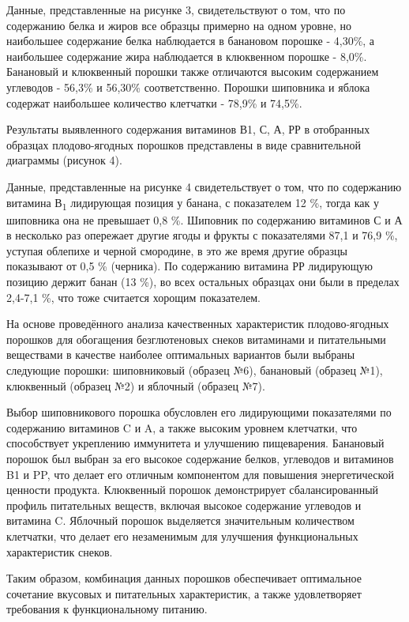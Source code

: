 \begin{multicols}{2}
Данные, представленные на рисунке 3, свидетельствуют о том, что по
содержанию белка и жиров все образцы примерно на одном уровне, но
наибольшее содержание белка наблюдается в банановом порошке - 4,30\%, а
наибольшее содержание жира наблюдается в клюквенном порошке - 8,0\%.
Банановый и клюквенный порошки также отличаются высоким содержанием
углеводов - 56,3\% и 56,30\% соответственно. Порошки шиповника и яблока
содержат наибольшее количество клетчатки - 78,9\% и 74,5\%.

Результаты выявленного содержания витаминов В1, С, А, РР в отобранных
образцах плодово-ягодных порошков представлены в виде сравнительной
диаграммы (рисунок 4).

Данные, представленные на рисунке 4 свидетельствует о том, что по
содержанию витамина В\textsubscript{1} лидирующая позиция у банана, с
показателем 12 \%, тогда как у шиповника она не превышает 0,8 \%.
Шиповник по содержанию витаминов С и А в несколько раз опережает другие
ягоды и фрукты с показателями 87,1 и 76,9 \%, уступая облепихе и черной
смородине, в это же время другие образцы показывают от 0,5 \% (черника).
По содержанию витамина РР лидирующую позицию держит банан (13 \%), во
всех остальных образцах они были в пределах 2,4-7,1 \%, что тоже
считается хорощим показателем.

На основе проведённого анализа качественных характеристик
плодово-ягодных порошков для обогащения безглютеновых снеков витаминами
и питательными веществами в качестве наиболее оптимальных вариантов были
выбраны следующие порошки: шиповниковый (образец №6), банановый (образец
№1), клюквенный (образец №2) и яблочный (образец №7).

Выбор шиповникового порошка обусловлен его лидирующими показателями по
содержанию витаминов C и A, а также высоким уровнем клетчатки, что
способствует укреплению иммунитета и улучшению пищеварения. Банановый
порошок был выбран за его высокое содержание белков, углеводов и
витаминов B1 и PP, что делает его отличным компонентом для повышения
энергетической ценности продукта. Клюквенный порошок демонстрирует
сбалансированный профиль питательных веществ, включая высокое содержание
углеводов и витамина C. Яблочный порошок выделяется значительным
количеством клетчатки, что делает его незаменимым для улучшения
функциональных характеристик снеков.

Таким образом, комбинация данных порошков обеспечивает оптимальное
сочетание вкусовых и питательных характеристик, а также удовлетворяет
требования к функциональному питанию.


\end{multicols}
